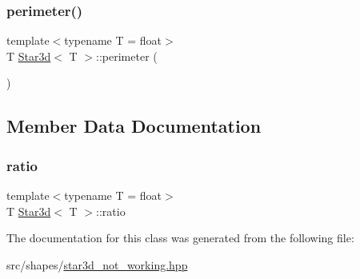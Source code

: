 \mbox{\label{classStar3d_aac560f44b7b7d278781231fbaf8312e1}} 
\subsubsection{\texorpdfstring{perimeter()}{perimeter()}}
{\footnotesize\ttfamily template$<$typename T  = float$>$ \\
T \mbox{\hyperlink{classStar3d}{Star3d}}$<$ T $>$\+::perimeter (\begin{DoxyParamCaption}{ }\end{DoxyParamCaption})}



\subsection{Member Data Documentation}
\mbox{\label{classStar3d_a4c2be78d1baa7a423885cc3574591848}} 
\subsubsection{\texorpdfstring{ratio}{ratio}}
{\footnotesize\ttfamily template$<$typename T  = float$>$ \\
T \mbox{\hyperlink{classStar3d}{Star3d}}$<$ T $>$\+::ratio}



The documentation for this class was generated from the following file\+:\begin{DoxyCompactItemize}
\item 
src/shapes/\mbox{\hyperlink{star3d__not__working_8hpp}{star3d\+\_\+not\+\_\+working.\+hpp}}\end{DoxyCompactItemize}
